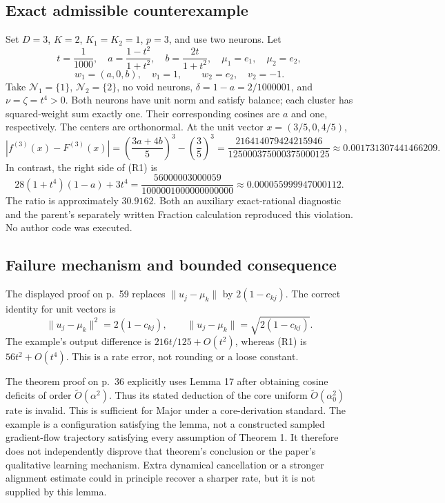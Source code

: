 \documentclass[10pt]{article}
\begin{document}
\subsection*{Exact admissible counterexample}
Set \(D=3\), \(K=2\), \(K_1=K_2=1\), \(p=3\), and use two neurons. Let \[t=\frac1{1000},\quad a=\frac{1-t^2}{1+t^2},\quad
 b=\frac{2t}{1+t^2},\quad
 \mu_1=e_1,\quad\mu_2=e_2,\] \[w_1=(a,0,b),\quad v_1=1,\qquad w_2=e_2,\quad v_2=-1.\] Take \(\mathcal N_1=\{1\}\), \(\mathcal N_2=\{2\}\), no void neurons, \(\delta=1-a=2/1000001\), and \(\nu=\zeta=t^4>0\). Both neurons have unit norm and satisfy balance; each cluster has squared-weight sum exactly one. Their corresponding cosines are \(a\) and one, respectively. The centers are orthonormal. At the unit vector \(x=(3/5,0,4/5)\), \[|f^{(3)}(x)-F^{(3)}(x)|
 =\left(\frac{3a+4b}{5}\right)^3-\left(\frac35\right)^3
 =\frac{216414079424215946}{125000375000375000125}
 \approx0.001731307441466209.\] In contrast, the right side of (R1) is \[28(1+t^4)(1-a)+3t^4
 =\frac{56000003000059}{1000001000000000000}
 \approx0.000055999947000112.\] The ratio is approximately \(30.9162\). Both an auxiliary exact-rational diagnostic and the parent’s separately written Fraction calculation reproduced this violation. No author code was executed.\par
\subsection*{Failure mechanism and bounded consequence}
The displayed proof on p. 59 replaces \(\|u_j-\mu_k\|\) by \(2(1-c_{kj})\). The correct identity for unit vectors is \[\|u_j-\mu_k\|^2=2(1-c_{kj}),\qquad
 \|u_j-\mu_k\|=\sqrt{2(1-c_{kj})}.\] The example’s output difference is \(216t/125+O(t^2)\), whereas (R1) is \(56t^2+O(t^4)\). This is a rate error, not rounding or a loose constant.\par
The theorem proof on p. 36 explicitly uses Lemma 17 after obtaining cosine deficits of order \(\widetilde O(\alpha^2)\). Thus its stated deduction of the core uniform \(\widetilde O(\alpha_0^2)\) rate is invalid. This is sufficient for Major under a core-derivation standard. The example is a configuration satisfying the lemma, not a constructed sampled gradient-flow trajectory satisfying every assumption of Theorem 1. It therefore does not independently disprove that theorem’s conclusion or the paper’s qualitative learning mechanism. Extra dynamical cancellation or a stronger alignment estimate could in principle recover a sharper rate, but it is not supplied by this lemma.\par
\end{document}
